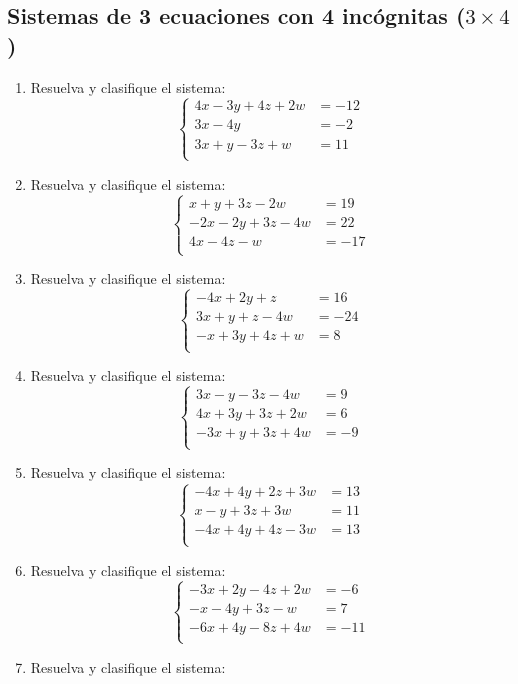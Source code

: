 \documentclass[11pt]{article}
\begin{document}
\subsection{Sistemas de 3 ecuaciones con 4 incógnitas ($ 3\times 4 $)}
\begin{enumerate}
\item Resuelva y clasifique el sistema:
\[
\left\{\begin{aligned}
4x-3y+4z+2w&=-12\\
3x-4y&=-2\\
3x+y-3z+w&=11\\
\end{aligned}\right.
\]
\item Resuelva y clasifique el sistema:
\[
\left\{\begin{aligned}
x+y+3z-2w&=19\\
-2x-2y+3z-4w&=22\\
4x-4z-w&=-17\\
\end{aligned}\right.
\]
\item Resuelva y clasifique el sistema:
\[
\left\{\begin{aligned}
-4x+2y+z&=16\\
3x+y+z-4w&=-24\\
-x+3y+4z+w&=8\\
\end{aligned}\right.
\]
\item Resuelva y clasifique el sistema:
\[
\left\{\begin{aligned}
3x-y-3z-4w&=9\\
4x+3y+3z+2w&=6\\
-3x+y+3z+4w&=-9\\
\end{aligned}\right.
\]
\item Resuelva y clasifique el sistema:
\[
\left\{\begin{aligned}
-4x+4y+2z+3w&=13\\
x-y+3z+3w&=11\\
-4x+4y+4z-3w&=13\\
\end{aligned}\right.
\]
\item Resuelva y clasifique el sistema:
\[
\left\{\begin{aligned}
-3x+2y-4z+2w&=-6\\
-x-4y+3z-w&=7\\
-6x+4y-8z+4w&=-11\\
\end{aligned}\right.
\]
\item Resuelva y clasifique el sistema:

\end{enumerate}
\end{document}
